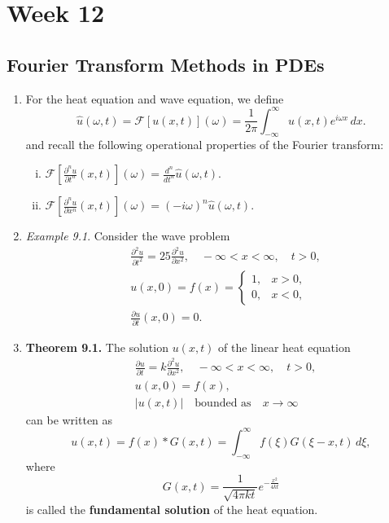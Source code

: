 \chapter{Week 12}
\setcounter{weekpage}{1}
\thispagestyle{plainweek}

\section{Fourier Transform Methods in PDEs}

\begin{enumerate}


\item For the heat equation and wave equation, we define
\[\widehat{u}(\omega,t) = \mathcal{F}\left[ u(x,t) \right](\omega) = \frac{1}{2\pi}\int_{-\infty}^{\infty} u(x,t) e^{i\omega x} \, dx. \]
and recall the following operational properties of the Fourier transform:
\begin{enumerate}[i)]
    \item $\displaystyle \mathcal{F}\left[ \frac{\partial^{n} u}{\partial t^{n}}(x,t) \right](\omega) = \frac{d^{n}}{dt^{n}}\widehat{u}(\omega, t)$.
    \item $\displaystyle \mathcal{F}\left[ \frac{\partial^{n} u}{\partial x^{n}}(x,t) \right](\omega) = (-i\omega)^{n}\widehat{u}(\omega, t)$.
\end{enumerate}


\item \textit{Example 9.1}. Consider the wave problem
\begin{align*}
    & \frac{\partial ^{2} u}{\partial t^{2}}=25 \frac{\partial ^{2} u}{\partial x^{2}}, \quad -\infty<x<\infty, \quad t>0,\\
    & u(x,0)=f(x)=\begin{cases}
              1, & x>0,\\
              0, & x<0,
             \end{cases} \\
    & \frac{\partial u}{\partial t}(x,0)= 0.
\end{align*}

\newpage

\item \textbf{Theorem 9.1.} The solution $u(x, t)$ of the linear heat equation
\begin{align*}
    & \frac{\partial u}{\partial t}=k \frac{\partial ^{2} u}{\partial x^{2}}, \quad -\infty<x<\infty, \quad t>0,\\
    & u(x,0)=f(x), \\
    & |u(x,t)| \quad \text{bounded as} \quad x\to \infty
\end{align*}
can be written as
\[u(x,t)=f(x)*G(x,t)=\int_{-\infty}^{\infty}f(\xi)G(\xi-x,t)\,d\xi,\]
where
\[G(x,t) = \frac{1}{\sqrt{4\pi k t}} e^{-\frac{x^{2}}{4kt}}\]
is called the \textbf{fundamental solution} of the heat equation.



\end{enumerate}
